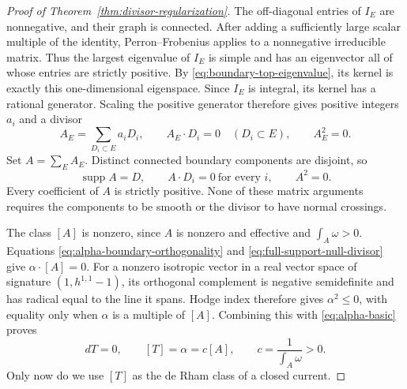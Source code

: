 \documentclass[11pt]{amsart}
\theoremstyle{definition}
\theoremstyle{remark}
\numberwithin{equation}{section}
\begin{document}
\begin{proof}[Proof of Theorem~\ref{thm:divisor-regularization}]
The off-diagonal entries of $I_E$ are nonnegative, and their graph
is connected.  After adding a sufficiently large scalar multiple
of the identity, Perron--Frobenius applies to a nonnegative
irreducible matrix.  Thus the largest eigenvalue of $I_E$ is
simple and has an eigenvector all of whose entries are strictly
positive.  By \eqref{eq:boundary-top-eigenvalue}, its kernel is
exactly this one-dimensional eigenspace.  Since $I_E$ is integral,
its kernel has a rational generator.  Scaling the positive
generator therefore gives positive integers $a_i$ and a divisor
\[
 A_E=\sum_{D_i\subset E}a_iD_i,\qquad
 A_E\cdot D_i=0\quad(D_i\subset E),\qquad A_E^2=0.
\]
Set $A=\sum_E A_E$.  Distinct connected boundary components are
disjoint, so
\begin{equation}
\label{eq:full-support-null-divisor}
 \operatorname{supp}A=D,\qquad
 A\cdot D_i=0\ \text{for every }i,\qquad A^2=0.
\end{equation}
Every coefficient of $A$ is strictly positive.  None of these
matrix arguments requires the components to be smooth or the
divisor to have normal crossings.

The class $[A]$ is nonzero, since $A$ is nonzero and effective and
$\int_A\omega>0$.  Equations
\eqref{eq:alpha-boundary-orthogonality} and
\eqref{eq:full-support-null-divisor} give $\alpha\cdot[A]=0$.
For a nonzero isotropic vector in a real vector space of signature
$(1,h^{1,1}-1)$, its orthogonal complement is negative semidefinite
and has radical equal to the line it spans.  Hodge index therefore
gives $\alpha^2\leq0$, with equality only when $\alpha$ is a
multiple of $[A]$.  Combining this with \eqref{eq:alpha-basic}
proves
\begin{equation}
\label{eq:closed-current-null-class}
 dT=0,\qquad [T]=\alpha=c[A],\qquad
 c=\frac{1}{\int_A\omega}>0.
\end{equation}
Only now do we use $[T]$ as the de Rham class of a closed current.


\end{proof}
\end{document}
